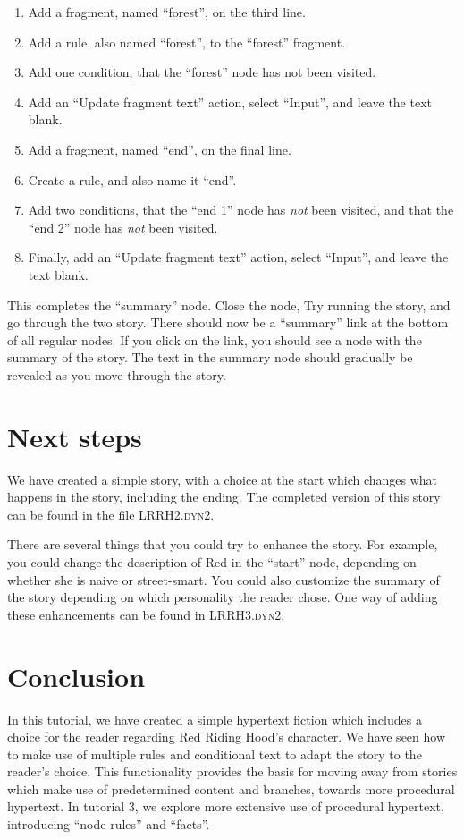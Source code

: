\documentclass{article}
\begin{document}
\begin{enumerate}
  \item Add a fragment, named ``forest'', on the third line.
  \item Add a rule, also named ``forest'', to the ``forest'' fragment.
  \item Add one condition, that the ``forest'' node has not been visited.
  \item Add an ``Update fragment text'' action, select ``Input'', and leave the text blank.
  \item Add a fragment, named ``end'', on the final line.
  \item Create a rule, and also name it ``end''.
  \item Add two conditions, that the ``end 1'' node has \textit{not} been
  visited, and that the ``end 2'' node has \textit{not} been visited.
  \item Finally, add an ``Update fragment text'' action, select ``Input'', and leave the text blank.
\end{enumerate}

This completes the ``summary'' node. Close the node, Try running the story, and go through the two story. There should now be a ``summary'' link at the bottom of all regular nodes. If you click on the link, you should see a node with the summary of the story. The text in the summary node should gradually be revealed as you move through the story.

\section{Next steps}

We have created a simple story, with a choice at the start which changes what happens in the story, including the ending. The completed version of this story can be found in the file \textsc{LRRH2.dyn2}.

There are several things that you could try to enhance the story. For example, you could change the description of Red in the ``start'' node, depending on whether she is naive or street-smart. You could also customize the summary of the story depending on which personality the reader chose. One way of adding these enhancements can be found in \textsc{LRRH3.dyn2}.

\section{Conclusion}

In this tutorial, we have created a simple hypertext fiction which includes a choice for the reader regarding Red Riding Hood's character. We have seen how to make use of multiple rules and conditional text to adapt the story to the reader's choice. This functionality provides the basis for moving away from stories which make use of predetermined content and branches, towards more procedural hypertext. In tutorial 3, we explore more extensive use of procedural hypertext, introducing ``node rules'' and ``facts''.
\end{document}

